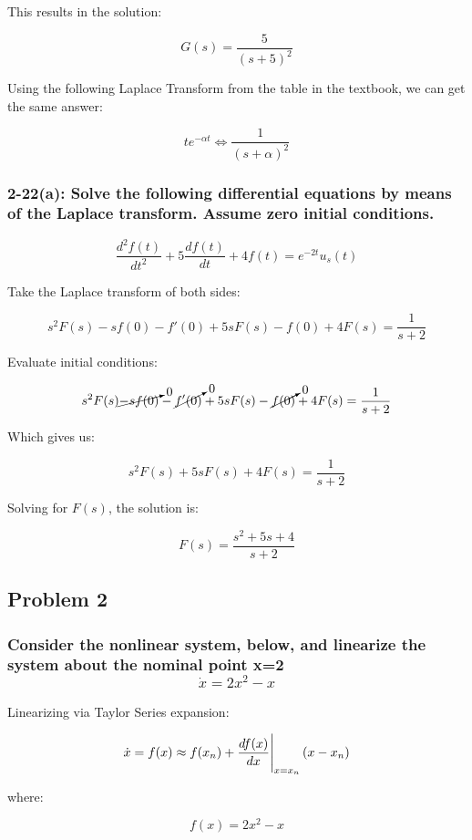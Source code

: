 \documentclass[12pt, letterpaper]{../assignment}
\begin{document}
This results in the solution:

\begin{answer}
$$ G(s) = \frac{5}{( s + 5 )^2}$$
\end{answer}

Using the following Laplace Transform from the table in the textbook, we can get the same answer:

$$ t e^{-\alpha t} \Leftrightarrow \frac{1}{(s+\alpha)^2} $$

\subsubsection*{2-22(a): Solve the following differential equations by means of the Laplace transform.
Assume zero initial conditions.}

$$ \frac{d^2 f(t)}{d t^2} + 5\frac{d f(t)}{d t} + 4 f(t) = e^{-2t} u_s(t) $$

Take the Laplace transform of both sides:

$$ s^2 F(s) - s f(0) - f'(0) + 5s F(s) - f(0)  + 4 F(s) =  \frac{1}{s+2} $$

Evaluate initial conditions:

$$ s^2 F(s) \cancelto{0}{- s f(0)} - \cancelto{0}{f'(0)} + 5s F(s) - \cancelto{0}{f(0)}  + 4 F(s) =  \frac{1}{s+2} $$

Which gives us:

$$ s^2 F(s) + 5s F(s)  + 4 F(s) =  \frac{1}{s+2} $$

Solving for $F(s)$, the solution is:

\begin{answer}
$$ F(s) =  \frac{s^2 + 5s + 4}{s+2} $$
\end{answer}

\subsection*{Problem 2}
\subsubsection*{Consider the nonlinear system, below, and linearize the system about the nominal point x=2
$$ \dot{x} = 2 x^2 - x $$ }

Linearizing via Taylor Series expansion:

$$ \dot{x} = f(x) \approx f(x_n) + \eval{\frac{d f(x)}{d x}}_{x=x_n}(x-x_n)$$

where:

$$ f(x) = 2 x^2 - x $$
\end{document}
